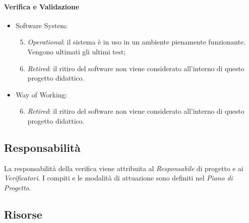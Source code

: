 	\paragraph{Verifica e Validazione}	
		\begin{itemize}
    		\item Software System:
    			\begin{enumerate}
    			\setcounter{enumi}{4}
    				\item \emph{Operational}: il sistema è in uso in un ambiente pienamente funzionante. Vengono ultimati gli ultimi test;
    				\item \emph{Retired}: il ritiro del software non viene considerato all'interno di questo progetto didattico.
    			\end{enumerate}
    		\item Way of Working:
    			\begin{enumerate}
    			\setcounter{enumi}{5}
    				\item \emph{Retired}: il ritiro del software non viene considerato all'interno di questo progetto didattico.
    			\end{enumerate}
    	\end{itemize}
	
		
	\subsection{Responsabilità}

	La responsabilità della verifica viene attribuita al \emph{Responsabile} di progetto e ai \emph{Verificatori}. I compiti e le modalità di attuazione sono definiti nel \emph{Piano di Progetto}.
	
	\subsection{Risorse}

